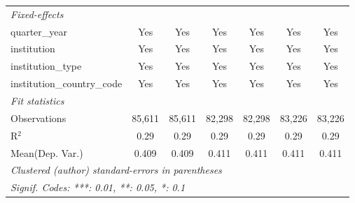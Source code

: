 \begin{tabular}{lcccccc}
   \midrule
   \emph{Fixed-effects}\\
   quarter\_year                      & Yes     & Yes           & Yes     & Yes           & Yes     & Yes\\  
   institution                        & Yes     & Yes           & Yes     & Yes           & Yes     & Yes\\  
   institution\_type                  & Yes     & Yes           & Yes     & Yes           & Yes     & Yes\\  
   institution\_country\_code         & Yes     & Yes           & Yes     & Yes           & Yes     & Yes\\  
   \midrule
   \emph{Fit statistics}\\
   Observations                       & 85,611  & 85,611        & 82,298  & 82,298        & 83,226  & 83,226\\  
   R$^2$                              & 0.29    & 0.29          & 0.29    & 0.29          & 0.29    & 0.29\\  
Mean(Dep. Var.) & 0.409 & 0.409 & 0.411 & 0.411 & 0.411 & 0.411 \\
   \midrule \midrule
   \multicolumn{7}{l}{\emph{Clustered (author) standard-errors in parentheses}}\\
   \multicolumn{7}{l}{\emph{Signif. Codes: ***: 0.01, **: 0.05, *: 0.1}}\\
\end{tabular}
\par\endgroup
